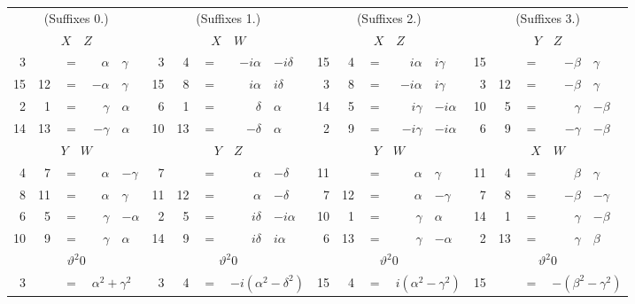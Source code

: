 \documentclass[11pt]{article}
\begin{document}
\smallskip
{\footnotesize
\begin{center}
\begin{tabular}{rrcrl||rrcrl||rrcrl||rrcrl}
\multicolumn{5}{c||}{(Suffixes 0.)} & \multicolumn{5}{c||}{(Suffixes 1.)} & \multicolumn{5}{c||}{(Suffixes 2.)} & \multicolumn{5}{c}{(Suffixes 3.)}\\
\multicolumn{5}{c||}{$X\quad Z$} & \multicolumn{5}{c||}{$X\quad W$} & \multicolumn{5}{c||}{$X\quad Z$} & \multicolumn{5}{c}{$Y\quad Z$}\\\hline
3 & & $=$ & $\alpha$ & $\gamma$ & 3 & 4 & $=$ & $-i\alpha$ & $-i\delta$ & 15 & 4 & $=$ & $i\alpha$ & $i\gamma$ & 15 & & $=$ & $-\beta$ & $\gamma$\\
15 & 12 & $=$ & $-\alpha$ & $\gamma$ & 15 & 8 & $=$ & $i\alpha$ & $i\delta$ & 3 & 8 & $=$ & $-i\alpha$ & $i\gamma$ & 3 & 12 & $=$ & $-\beta$ & $\gamma$\\
2 & 1 & $=$ & $\gamma$ & $\alpha$ & 6 & 1 & $=$ & $\delta$ & $\alpha$ & 14 & 5 & $=$ & $i\gamma$ & $-i\alpha$ & 10 & 5 & $=$ & $\gamma$ & $-\beta$\\
14 & 13 & $=$ & $-\gamma$ & $\alpha$ & 10 & 13 & $=$ & $-\delta$ & $\alpha$ & 2 & 9 & $=$ & $-i\gamma$ & $-i\alpha$ & 6 & 9 & $=$ & $-\gamma$ & $-\beta$\\\hline
\multicolumn{5}{c||}{$Y\quad W$} & \multicolumn{5}{c||}{$Y\quad Z$} & \multicolumn{5}{c||}{$Y\quad W$} & \multicolumn{5}{c}{$X\quad W$}\\
4 & 7 & $=$ & $\alpha$ & $-\gamma$ & 7 & & $=$ & $\alpha$ & $-\delta$ & 11 & & $=$ & $\alpha$ & $\gamma$ & 11 & 4 & $=$ & $\beta$ & $\gamma$\\
8 & 11 & $=$ & $\alpha$ & $\gamma$ & 11 & 12 & $=$ & $\alpha$ & $-\delta$ & 7 & 12 & $=$ & $\alpha$ & $-\gamma$ & 7 & 8 & $=$ & $-\beta$ & $-\gamma$\\
6 & 5 & $=$ & $\gamma$ & $-\alpha$ & 2 & 5 & $=$ & $i\delta$ & $-i\alpha$ & 10 & 1 & $=$ & $\gamma$ & $\alpha$ & 14 & 1 & $=$ & $\gamma$ & $-\beta$\\
10 & 9 & $=$ & $\gamma$ & $\alpha$ & 14 & 9 & $=$ & $i\delta$ & $i\alpha$ & 6 & 13 & $=$ & $\gamma$ & $-\alpha$ & 2 & 13 & $=$ & $\gamma$ & $\beta$\\\hline
\multicolumn{5}{c||}{$\vartheta^2 0$} & \multicolumn{5}{c||}{$\vartheta^2 0$} & \multicolumn{5}{c||}{$\vartheta^2 0$} & \multicolumn{5}{c}{$\vartheta^2 0$}\\
3 & & $=$ & \multicolumn{2}{l||}{$\alpha^2 + \gamma^2$} & 3 & 4 & $=$ & \multicolumn{2}{l||}{$-i(\alpha^2 - \delta^2)$} & 15 & 4 & $=$ & \multicolumn{2}{l||}{$i(\alpha^2 - \gamma^2)$} & 15 & & $=$ & \multicolumn{2}{l}{$-(\beta^2 - \gamma^2)$}\\

\end{tabular}
\end{center}}
\end{document}
